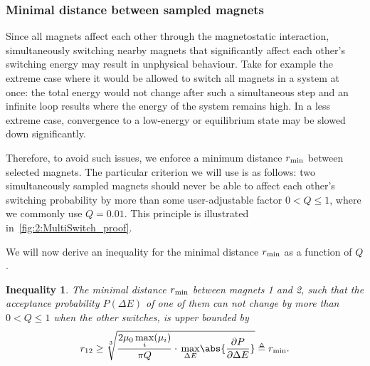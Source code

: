\subsubsection{Minimal distance between sampled magnets} %
Since all magnets affect each other through the magnetostatic interaction, simultaneously switching nearby magnets that significantly affect each other's switching energy may result in unphysical behaviour.
Take for example the extreme case where it would be allowed to switch all magnets in a system at once: the total energy would not change after such a simultaneous step and an infinite loop results where the energy of the system remains high.
In a less extreme case, convergence to a low-energy or equilibrium state may be slowed down significantly. \par
Therefore, to avoid such issues, we enforce a minimum distance $r_\mathrm{min}$ between selected magnets.
The particular criterion we will use is as follows: two simultaneously sampled magnets should never be able to affect each other's switching probability by more than some user-adjustable factor $0 < Q \leq 1$, where we commonly use $Q=0.01$.
This principle is illustrated in~\cref{fig:2:MultiSwitch_proof}.


We will now derive an inequality for the minimal distance $r_\mathrm{min}$ as a function of $Q$.
\newtheorem{inequality}{Inequality}
\begin{inequality}
	The minimal distance $r_\mathrm{min}$ between magnets 1 and 2, such that the acceptance probability $P(\Delta E)$ of one of them can not change by more than $0 < Q \leq 1$ when the other switches, is upper bounded by
	\begin{equation}
		r_{12} \geq \sqrt[3]{\frac{2 \mu_0 \, \underset{i}{\max}(\mu_i)}{\pi Q} \cdot \, \underset{\Delta E}{\max} \abs{\frac{\partial P}{\partial \Delta E}}} \triangleq \rmin \mathrm{.}
		\label{eq:2:MultiSwitch_inequality}
	\end{equation}
\end{inequality}

